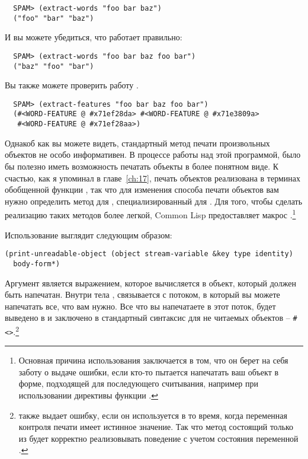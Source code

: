 \begin{verbatim}
  SPAM> (extract-words "foo bar baz")
  ("foo" "bar" "baz")
\end{verbatim}

И вы можете убедиться, что  работает правильно:

\begin{verbatim}
  SPAM> (extract-words "foo bar baz foo bar")
  ("baz" "foo" "bar")
\end{verbatim}

Вы также можете проверить работу .

\begin{verbatim}
  SPAM> (extract-features "foo bar baz foo bar")
  (#<WORD-FEATURE @ #x71ef28da> #<WORD-FEATURE @ #x71e3809a>
   #<WORD-FEATURE @ #x71ef28aa>)
\end{verbatim}

Однакоб как вы можете видеть, стандартный метод печати произвольных объектов не особо
информативен.  В процессе работы над этой программой, было бы полезно иметь возможность
печатать объекты  в более понятном виде.  К счастью, как я упоминал в
главе~\ref{ch:17}, печать объектов реализована в терминах обобщенной функции
, так что для изменения способа печати объектов  вам
нужно определить метод для , специализированный для
.  Для того, чтобы сделать реализацию таких методов более легкой,
Common Lisp предоставляет макрос .\footnote{Основная причина
  использования  заключается в том, что он берет на себя
  заботу о выдаче ошибки, если кто-то пытается напечатать ваш объект в форме, подходящей
  для последующего считывания, например при использовании директивы  функции
  .}

Использование  выглядит следующим образом:

\begin{lstlisting}
(print-unreadable-object (object stream-variable &key type identity)
  body-form*)
\end{lstlisting}

Аргумент  является выражением, которое вычисляется в объект, который должен
быть напечатан.  Внутри тела , 
связывается с потоком, в который вы можете напечатать все, что вам нужно. Все что вы
напечатаете в этот поток, будет выведено в  и заключено в
стандартный синтаксис для не читаемых объектов --
\lstinline!#<>!.\footnote{ также выдает ошибку, если он
  используется в то время, когда переменная контроля печати  имеет
  истинное значение.  Так что метод  состоящий только из
   будет корректно реализовывать поведение
   с учетом состояния переменной .}

